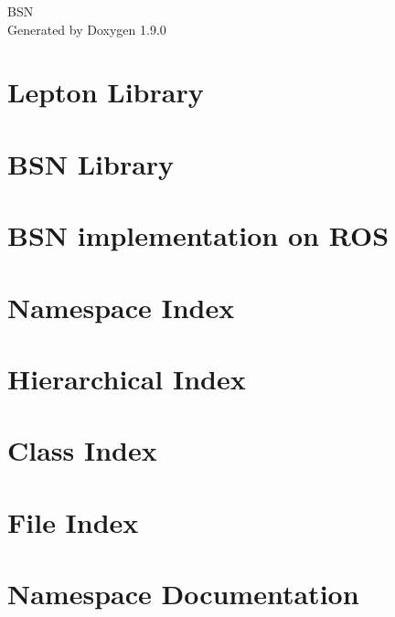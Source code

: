 \let\mypdfximage\pdfximage\def\pdfximage{\immediate\mypdfximage}\documentclass[twoside]{book}
\newcommand{\+}{\discretionary{\mbox{\scriptsize$\hookleftarrow$}}{}{}}
\newcommand{\clearemptydoublepage}{%
  \newpage{\pagestyle{empty}\cleardoublepage}%
}
\begin{document}
\hypersetup{pageanchor=false,
             bookmarksnumbered=true,
             pdfencoding=unicode
            }
\begin{titlepage}
\vspace*{7cm}
\begin{center}%
{\Large BSN }\\
\vspace*{1cm}
{\large Generated by Doxygen 1.9.0}\\
\end{center}
\end{titlepage}
\clearemptydoublepage
{}
\tableofcontents
\clearemptydoublepage
{}
\hypersetup{pageanchor=true}

\chapter{Lepton Library}
\label{md_lepton_README}

\chapter{BSN Library}
\label{md_libbsn_README}

\chapter{BSN implementation on ROS}
\label{md_README}

\chapter{Namespace Index}

\chapter{Hierarchical Index}

\chapter{Class Index}

\chapter{File Index}

\chapter{Namespace Documentation}





















\end{document}

